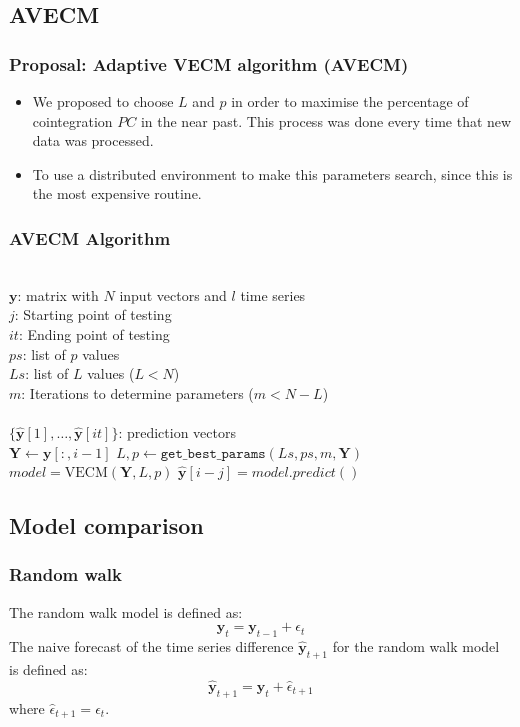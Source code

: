 \documentclass[compress,red]{beamer}
\begin{document}
\subsection{AVECM}
\begin{frame}
\frametitle{Proposal: Adaptive VECM algorithm (AVECM)}
\begin{itemize}
\item We proposed to choose $L$ and $p$ in order to maximise the percentage of
cointegration $PC$ in the near past. This process was done every time that new data was processed. 
\item To use a distributed environment to make this parameters search, since this is the most expensive routine.
\end{itemize}
\end{frame}


\begin{frame}
\frametitle{AVECM Algorithm}
\begin{algorithmic}[1]
\REQUIRE $\,$ \\
$\mathbf{y}$: matrix with $N$ input vectors and $l$ time series\\
$j$: Starting point of testing \\
$it$: Ending point of testing \\
$ps$: list of $p$ values \\
$Ls$: list of $L$ values ($L<N$) \\
$m$: Iterations to determine parameters ($m < N-L$)\\
\ENSURE  $\,$ \\
$\{ \hat{\mathbf{y}}[1],\dots,\hat{\mathbf{y}}[it]\}$: prediction vectors \\
   \STATE $\mathbf{Y} \gets \mathbf{y}[:,i-1]$
    \STATE $L,p \gets
    \texttt{get\_best\_params}(Ls,ps,m,\mathbf{Y})$
        \STATE $model = \text{VECM}(\mathbf{Y},L, p)$
        \STATE $\hat{\mathbf{y}}[i-j] = model.predict()$
\ENDFOR
\end{algorithmic}
\end{frame}

\subsection{Model comparison} 
\begin{frame}
\frametitle{Random walk}
The random walk model is defined as:
\begin{equation}
\mathbf{y}_t = \mathbf{y}_{t-1} + \epsilon_{t}
\label{rwmodel}
\end{equation}
The naive forecast of the time series difference $\hat{\mathbf{y}}_{t+1}$ for the random walk model is defined as:
\begin{equation}
\hat{\mathbf{y}}_{t+1} = \mathbf{y}_t + \hat{\epsilon}_{t+1} 
\end{equation}
\noindent where  $\hat{\epsilon}_{t+1} = \epsilon_{t}$.
\end{frame}
\end{document}
